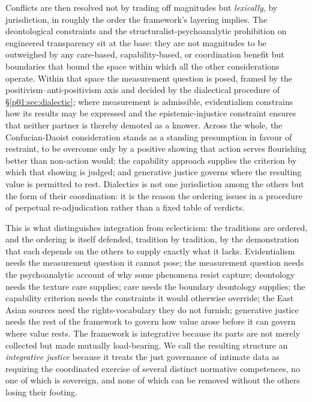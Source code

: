 \documentclass[11pt,a4paper]{article}
\begin{document}
\begin{small}
\begin{longtable}{@{}>{\raggedright\arraybackslash}p{} >{\raggedright\arraybackslash}p{} >{\raggedright\arraybackslash}p{}@{}}
\end{longtable}
\end{small}

\noindent Conflicts are then resolved not by trading off magnitudes but \emph{lexically}, by jurisdiction, in roughly the order the framework's layering implies. The deontological constraints and the structuralist-psychoanalytic prohibition on engineered transparency sit at the base: they are not magnitudes to be outweighed by any care-based, capability-based, or coordination benefit but boundaries that bound the space within which all the other considerations operate. Within that space the measurement question is posed, framed by the positivism--anti-positivism axis and decided by the dialectical procedure of §\ref{p01:sec:dialectic}; where measurement is admissible, evidentialism constrains how its results may be expressed and the epistemic-injustice constraint ensures that neither partner is thereby demoted as a knower. Across the whole, the Confucian-Daoist consideration stands as a standing presumption in favour of restraint, to be overcome only by a positive showing that action serves flourishing better than non-action would; the capability approach supplies the criterion by which that showing is judged; and generative justice governs where the resulting value is permitted to rest. Dialectics is not one jurisdiction among the others but the form of their coordination: it is the reason the ordering issues in a procedure of perpetual re-adjudication rather than a fixed table of verdicts.

This is what distinguishes integration from eclecticism: the traditions are ordered, and the ordering is itself defended, tradition by tradition, by the demonstration that each depends on the others to supply exactly what it lacks. Evidentialism needs the measurement question it cannot pose; the measurement question needs the psychoanalytic account of why some phenomena resist capture; deontology needs the texture care supplies; care needs the boundary deontology supplies; the capability criterion needs the constraints it would otherwise override; the East Asian sources need the rights-vocabulary they do not furnish; generative justice needs the rest of the framework to govern how value arose before it can govern where value rests. The framework is integrative because its parts are not merely collected but made mutually load-bearing. We call the resulting structure an \emph{integrative justice} because it treats the just governance of intimate data as requiring the coordinated exercise of several distinct normative competences, no one of which is sovereign, and none of which can be removed without the others losing their footing.
\end{document}
